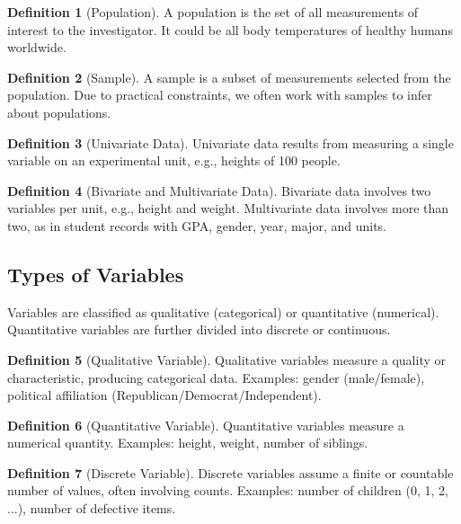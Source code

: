 \documentclass{article}
\theoremstyle{definition}
\newtheorem{definition}{Definition}
\begin{document}
	\begin{definition}[Population]
		A population is the set of all measurements of interest to the investigator. It could be all body temperatures of healthy humans worldwide.
	\end{definition}
	
	\begin{definition}[Sample]
		A sample is a subset of measurements selected from the population. Due to practical constraints, we often work with samples to infer about populations.
	\end{definition}
	
	\begin{definition}[Univariate Data]
		Univariate data results from measuring a single variable on an experimental unit, e.g., heights of 100 people.
	\end{definition}
	
	\begin{definition}[Bivariate and Multivariate Data]
		Bivariate data involves two variables per unit, e.g., height and weight. Multivariate data involves more than two, as in student records with GPA, gender, year, major, and units.
	\end{definition}
	\newpage
	\subsection{Types of Variables}
	
	Variables are classified as qualitative (categorical) or quantitative (numerical). Quantitative variables are further divided into discrete or continuous.
	
	\begin{definition}[Qualitative Variable]
		Qualitative variables measure a quality or characteristic, producing categorical data. Examples: gender (male/female), political affiliation (Republican/Democrat/Independent).
	\end{definition}
	
	\begin{definition}[Quantitative Variable]
		Quantitative variables measure a numerical quantity. Examples: height, weight, number of siblings.
	\end{definition}
	
	\begin{definition}[Discrete Variable]
		Discrete variables assume a finite or countable number of values, often involving counts. Examples: number of children (0, 1, 2, ...), number of defective items.
	\end{definition}
	
\end{document}
